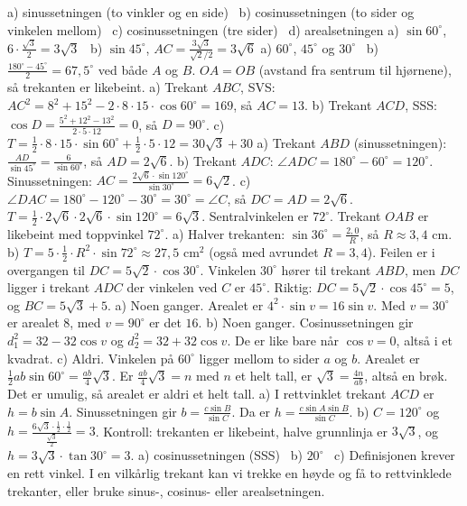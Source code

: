 
 a) sinussetningen (to vinkler og en side) \ b) cosinussetningen (to sider og vinkelen mellom) \ c) cosinussetningen (tre sider) \ d) arealsetningen
 a) $\sin 60^\circ$, $6 \cdot \frac{\sqrt3}{2} = 3\sqrt3$ \ b) $\sin 45^\circ$, $AC = \frac{3\sqrt3}{\sqrt2/2} = 3\sqrt6$
 a) $60^\circ$, $45^\circ$ og $30^\circ$ \ b) $\frac{180^\circ - 45^\circ}{2} = 67,5^\circ$ ved både $A$ og $B$. $OA = OB$ (avstand fra sentrum til hjørnene), så trekanten er likebeint.
 a) Trekant $ABC$, SVS: $AC^2 = 8^2 + 15^2 - 2 \cdot 8 \cdot 15 \cdot \cos 60^\circ = 169$, så $AC = 13$.
b) Trekant $ACD$, SSS: $\cos D = \frac{5^2 + 12^2 - 13^2}{2 \cdot 5 \cdot 12} = 0$, så $D = 90^\circ$.
c) $T = \frac12 \cdot 8 \cdot 15 \cdot \sin 60^\circ + \frac12 \cdot 5 \cdot 12 = 30\sqrt3 + 30$
 a) Trekant $ABD$ (sinussetningen): $\frac{AD}{\sin 45^\circ} = \frac{6}{\sin 60^\circ}$, så $AD = 2\sqrt6$.
b) Trekant $ADC$: $\angle ADC = 180^\circ - 60^\circ = 120^\circ$. Sinussetningen: $AC = \frac{2\sqrt6 \cdot \sin 120^\circ}{\sin 30^\circ} = 6\sqrt2$.
c) $\angle DAC = 180^\circ - 120^\circ - 30^\circ = 30^\circ = \angle C$, så $DC = AD = 2\sqrt6$. $T = \frac12 \cdot 2\sqrt6 \cdot 2\sqrt6 \cdot \sin 120^\circ = 6\sqrt3$.
 Sentralvinkelen er $72^\circ$. Trekant $OAB$ er likebeint med toppvinkel $72^\circ$.
a) Halver trekanten: $\sin 36^\circ = \frac{2,0}{R}$, så $R \approx 3,4$ cm.
b) $T = 5 \cdot \frac12 \cdot R^2 \cdot \sin 72^\circ \approx 27,5$ cm$^2$ (også med avrundet $R = 3,4$).
 Feilen er i overgangen til $DC = 5\sqrt2 \cdot \cos 30^\circ$. Vinkelen $30^\circ$ hører til trekant $ABD$, men $DC$ ligger i trekant $ADC$ der vinkelen ved $C$ er $45^\circ$. Riktig: $DC = 5\sqrt2 \cdot \cos 45^\circ = 5$, og $BC = 5\sqrt3 + 5$.
 a) Noen ganger. Arealet er $4^2 \cdot \sin v = 16 \sin v$. Med $v = 30^\circ$ er arealet $8$, med $v = 90^\circ$ er det $16$.
b) Noen ganger. Cosinussetningen gir $d_1^2 = 32 - 32\cos v$ og $d_2^2 = 32 + 32\cos v$. De er like bare når $\cos v = 0$, altså i et kvadrat.
c) Aldri. Vinkelen på $60^\circ$ ligger mellom to sider $a$ og $b$. Arealet er $\frac12 ab \sin 60^\circ = \frac{ab}{4}\sqrt3$. Er $\frac{ab}{4}\sqrt3 = n$ med $n$ et helt tall, er $\sqrt3 = \frac{4n}{ab}$, altså en brøk. Det er umulig, så arealet er aldri et helt tall.
 a) I rettvinklet trekant $ACD$ er $h = b \sin A$. Sinussetningen gir $b = \frac{c \sin B}{\sin C}$. Da er $h = \frac{c \sin A \sin B}{\sin C}$.
b) $C = 120^\circ$ og $h = \frac{6\sqrt3 \cdot \frac12 \cdot \frac12}{\frac{\sqrt3}{2}} = 3$. Kontroll: trekanten er likebeint, halve grunnlinja er $3\sqrt3$, og $h = 3\sqrt3 \cdot \tan 30^\circ = 3$.
 a) cosinussetningen (SSS) \ b) $20^\circ$ \ c) Definisjonen krever en rett vinkel. I en vilkårlig trekant kan vi trekke en høyde og få to rettvinklede trekanter, eller bruke sinus-, cosinus- eller arealsetningen.

